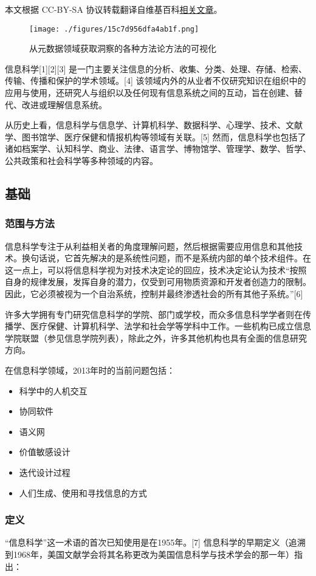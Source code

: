 
本文根据 CC-BY-SA 协议转载翻译自维基百科\href{https://en.wikipedia.org/wiki/Information_science}{相关文章}。

\begin{figure}[ht]
\centering
\texttt{[image: ./figures/15c7d956dfa4ab1f.png]}
\caption{从元数据领域获取洞察的各种方法论方法的可视化} \label{fig_INCE_1}
\end{figure}
信息科学[1][2][3] 是一门主要关注信息的分析、收集、分类、处理、存储、检索、传输、传播和保护的学术领域。[4] 该领域内外的从业者不仅研究知识在组织中的应用与使用，还研究人与组织以及任何现有信息系统之间的互动，旨在创建、替代、改进或理解信息系统。

从历史上看，信息科学与信息学、计算机科学、数据科学、心理学、技术、文献学、图书馆学、医疗保健和情报机构等领域有关联。[5] 然而，信息科学也包括了诸如档案学、认知科学、商业、法律、语言学、博物馆学、管理学、数学、哲学、公共政策和社会科学等多种领域的内容。
\subsection{基础} 
\subsubsection{范围与方法} 
信息科学专注于从利益相关者的角度理解问题，然后根据需要应用信息和其他技术。换句话说，它首先解决的是系统性问题，而不是系统内部的单个技术组件。在这一点上，可以将信息科学视为对技术决定论的回应，技术决定论认为技术“按照自身的规律发展，发挥自身的潜力，仅受到可用物质资源和开发者创造力的限制。因此，它必须被视为一个自治系统，控制并最终渗透社会的所有其他子系统。”[6]

许多大学拥有专门研究信息科学的学院、部门或学校，而众多信息科学学者则在传播学、医疗保健、计算机科学、法学和社会学等学科中工作。一些机构已成立信息学院联盟（参见信息学院列表），除此之外，许多其他机构也具有全面的信息研究方向。

在信息科学领域，2013年时的当前问题包括：
\begin{itemize}
\item 科学中的人机交互
\item 协同软件
\item 语义网
\item 价值敏感设计
\item 迭代设计过程
\item 人们生成、使用和寻找信息的方式
\end{itemize}
\subsubsection{定义}  
“信息科学”这一术语的首次已知使用是在1955年。[7] 信息科学的早期定义（追溯到1968年，美国文献学会将其名称更改为美国信息科学与技术学会的那一年）指出：

